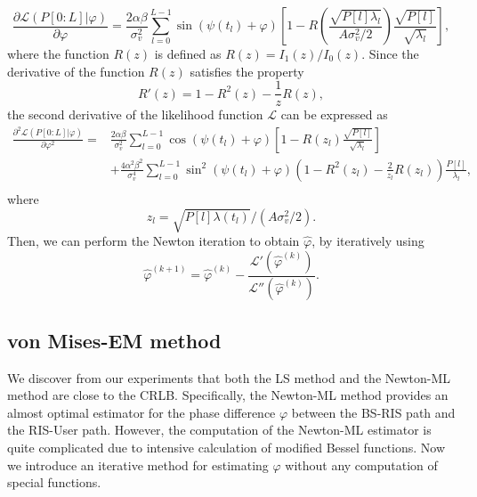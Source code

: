 \documentclass[12pt,draftclsnofoot,journal,onecolumn]{IEEEtran}
\theoremstyle{nonumberplain}
\begin{document}
    \begin{equation}
        \frac{\partial \mathcal{L}(P[0:L] | \varphi)}{\partial \varphi} = \frac{2\alpha\beta}{\sigma_v^2}\sum_{l=0}^{L-1}\sin(\psi(t_l)+\varphi) \left[1 - R\left( \frac{\sqrt{P[l]\lambda_l}}{A\sigma_v^2/2} \right) \frac{\sqrt{P[l]}}{\sqrt{\lambda_l}}\right],
    \end{equation}
    where the function $R(z)$ is defined as $R(z) = I_1(z)/I_0(z)$. Since the derivative of the function $R(z)$ satisfies the property
    \begin{equation}
        R'(z)=1-R^2(z)-\frac{1}{z}R(z),
    \end{equation}
    the second derivative of the likelihood function $\mathcal{L}$ can be expressed as
    \begin{equation}
        \begin{aligned}
        \frac{\partial^2 \mathcal{L}(P[0:L] | \varphi)}{\partial \varphi^2}  = &  \frac{2\alpha\beta}{\sigma_v^2} \sum_{l=0}^{L-1}{\cos(\psi(t_l)+\varphi)}\left[1 - R\left(z_l\right) \frac{\sqrt{P[l]}}{\sqrt{\lambda_l}}\right] \\
        & +\frac{4\alpha^2\beta^2}{\sigma_v^4}\sum_{l=0}^{L-1}{\sin^2(\psi(t_l)+\varphi) \left(1-R^2(z_l) -\frac{2}{z_l}R(z_l)\right)\frac{P[l]}{\lambda_l} },\\
        \end{aligned}
        \label{Second Derivative Likelihood}
    \end{equation}
    where
    \begin{equation}
        z_l = \sqrt{P[l]\lambda(t_l)}/(A\sigma_v^2/2).
        \label{eqn:def z_l}
    \end{equation}
    Then, we can perform the Newton iteration to obtain $\hat{\varphi}$, by iteratively using
    \begin{equation}
        \hat{\varphi}^{(k+1)} = \hat{\varphi}^{(k)} - \frac{\mathcal{L}'(\hat{\varphi}^{(k)})}{\mathcal{L}''(\hat{\varphi}^{(k)})}.
    \end{equation}

\subsection{von Mises-EM method}
    We discover from our experiments that both the LS method and the Newton-ML method are close to the CRLB. Specifically, the Newton-ML method provides an almost optimal estimator for the phase difference $\varphi$ between the BS-RIS path and the RIS-User path. However, the computation of the Newton-ML estimator is quite complicated due to intensive calculation of modified Bessel functions. Now we introduce an iterative method for estimating $\varphi$ without any computation of special functions.
\end{document}

